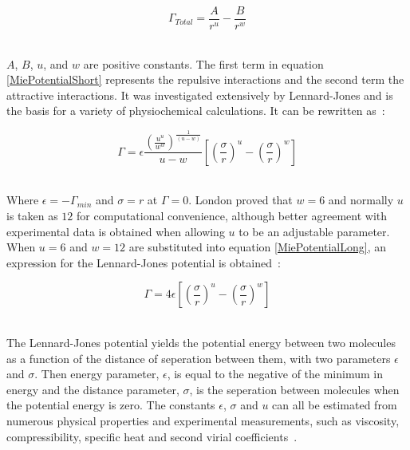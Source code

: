 \begin{equation}
\Gamma_{Total} = \frac{A}{r^{u}}-\frac{B}{r^{w}} \label{MiePotentialShort}
\end{equation}\

$A$, $B$, $u$, and $w$ are positive constants. The first term in equation \ref{MiePotentialShort} represents the repulsive interactions and the second term the attractive interactions. It was investigated extensively by Lennard-Jones and is the basis for a variety of physiochemical calculations. It can be rewritten as~\cite{MolecularThermodynamicsOfFluidPhaseEquilibria}:\

\begin{equation}
\Gamma = \epsilon \frac{\left( \frac{u^{u}}{w^{w}} \right)^{\frac{1}{\left(u-w\right)}}}{u-w}\left[\left(\frac{\sigma}{r}\right)^{u}-\left(\frac{\sigma}{r}\right)^{w}\right] \label{MiePotentialLong}
\end{equation}\
 
 
Where $\epsilon = -\Gamma_{min}$ and $\sigma = r$ at $\Gamma = 0$. London proved that $w = 6$ and normally $u$ is taken as $12$ for computational convenience, although better agreement with experimental data is obtained when allowing $u$ to be an adjustable parameter. When $u = 6$ and $w = 12$ are substituted into equation \ref{MiePotentialLong}, an expression for the Lennard-Jones potential is obtained~\cite{MolecularThermodynamicsOfFluidPhaseEquilibria}:\

\begin{equation}
\Gamma = 4\epsilon\left[\left(\frac{\sigma}{r}\right)^{u}-\left(\frac{\sigma}{r}\right)^{w}\right] \label{LennardJones}
\end{equation}\


The Lennard-Jones potential yields the potential energy between two molecules as a function of the distance of seperation between them, with two parameters $\epsilon$ and $\sigma$. Then energy parameter, $\epsilon$, is equal to the negative of the minimum in energy and the distance parameter, $\sigma$, is the seperation between molecules when the potential energy is zero. The constants $\epsilon$, $\sigma$ and $u$ can all be estimated from numerous physical properties and experimental measurements, such as viscosity, compressibility, specific heat and second virial coefficients~\cite{MolecularThermodynamicsOfFluidPhaseEquilibria}.\\

